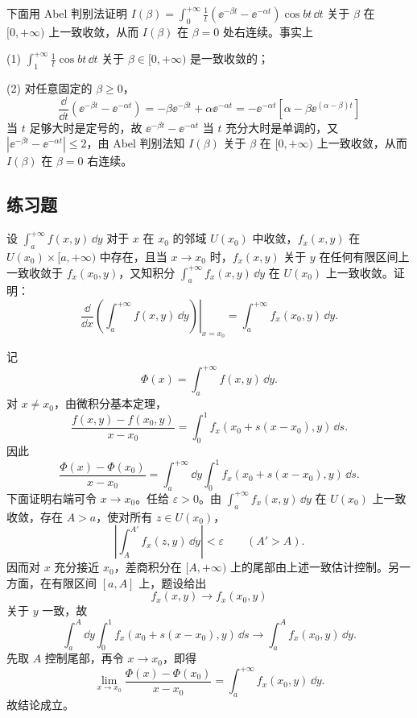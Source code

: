 \begin{xsolution}
下面用 Abel 判别法证明 $I(\beta)=\displaystyle\int_0^{+\infty}\frac1t(\ee^{-\beta t}-\ee^{-\alpha t})\cos bt\,\dd t$ 关于 $\beta$ 在 $[0,+\infty)$ 上一致收敛，从而 $I(\beta)$ 在 $\beta=0$ 处右连续。事实上

(1) $\displaystyle\int_1^{+\infty}\frac1t\cos bt\,\dd t$ 关于 $\beta\in[0,+\infty)$ 是一致收敛的；

(2) 对任意固定的 $\beta\geqslant0$，
\[
  \frac{\dd}{\dd t}(\ee^{-\beta t}-\ee^{-\alpha t})=-\beta\ee^{-\beta t}+\alpha\ee^{-\alpha t}
  =-\ee^{-\alpha t}[\alpha-\beta\ee^{(\alpha-\beta)t}]
\]
当 $t$ 足够大时是定号的，故 $\ee^{-\beta t}-\ee^{-\alpha t}$ 当 $t$ 充分大时是单调的，又 $|\ee^{-\beta t}-\ee^{-\alpha t}|\leqslant2$，由 Abel 判别法知 $I(\beta)$ 关于 $\beta$ 在 $[0,+\infty)$ 上一致收敛，从而 $I(\beta)$ 在 $\beta=0$ 右连续。
\end{xsolution}

\subsection{练习题}
\begin{xexercise}[1]
设 $\displaystyle\int_a^{+\infty}f(x,y)\,\dd y$ 对于 $x$ 在 $x_0$ 的邻域 $U(x_0)$ 中收敛，$f_x(x,y)$ 在 $U(x_0)\times[a,+\infty)$ 中存在，且当 $x\to x_0$ 时，$f_x(x,y)$ 关于 $y$ 在任何有限区间上一致收敛于 $f_x(x_0,y)$，又知积分 $\displaystyle\int_a^{+\infty}f_x(x,y)\,\dd y$ 在 $U(x_0)$ 上一致收敛。证明：
  \[
    \left.\frac{\dd}{\dd x}\left(\int_a^{+\infty}f(x,y)\,\dd y\right)\right|_{x=x_0}
    =\int_a^{+\infty}f_x(x_0,y)\,\dd y.
  \]
\end{xexercise}
\begin{xsolution}
记
\[
\Phi(x)=\int_a^{+\infty}f(x,y)\,\dd y.
\]
对 $x\neq x_0$，由微积分基本定理，
\[
\frac{f(x,y)-f(x_0,y)}{x-x_0}
=\int_0^1 f_x(x_0+s(x-x_0),y)\,\dd s.
\]
因此
\[
\frac{\Phi(x)-\Phi(x_0)}{x-x_0}
=\int_a^{+\infty}\dd y\int_0^1 f_x(x_0+s(x-x_0),y)\,\dd s.
\]
下面证明右端可令 $x\to x_0$。任给 $\varepsilon>0$。由
$\int_a^{+\infty}f_x(x,y)\,\dd y$ 在 $U(x_0)$ 上一致收敛，存在 $A>a$，使对所有 $z\in U(x_0)$，
\[
\left|\int_A^{A'}f_x(z,y)\,\dd y\right|<\varepsilon
\qquad(A'>A).
\]
因而对 $x$ 充分接近 $x_0$，差商积分在 $[A,+\infty)$ 上的尾部由上述一致估计控制。另一方面，在有限区间 $[a,A]$ 上，题设给出
\[
f_x(x,y)\to f_x(x_0,y)
\]
关于 $y$ 一致，故
\[
\int_a^A\dd y\int_0^1 f_x(x_0+s(x-x_0),y)\,\dd s
\to\int_a^A f_x(x_0,y)\,\dd y.
\]
先取 $A$ 控制尾部，再令 $x\to x_0$，即得
\[
\lim_{x\to x_0}\frac{\Phi(x)-\Phi(x_0)}{x-x_0}
=\int_a^{+\infty}f_x(x_0,y)\,\dd y.
\]
故结论成立。
\end{xsolution}


